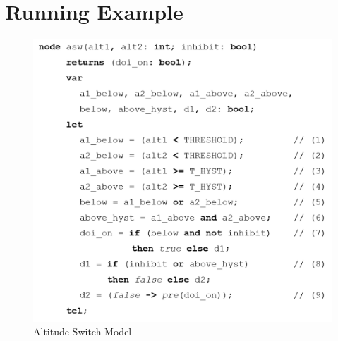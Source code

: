 \section{Running Example}
\label{sec:example}


\begin{figure}[t]
\centering
\includegraphics[width=\columnwidth]{figs/code.png}
\vspace{-0.1in}
\caption{Altitude Switch Model}
\label{fig:asw}
\end{figure}

